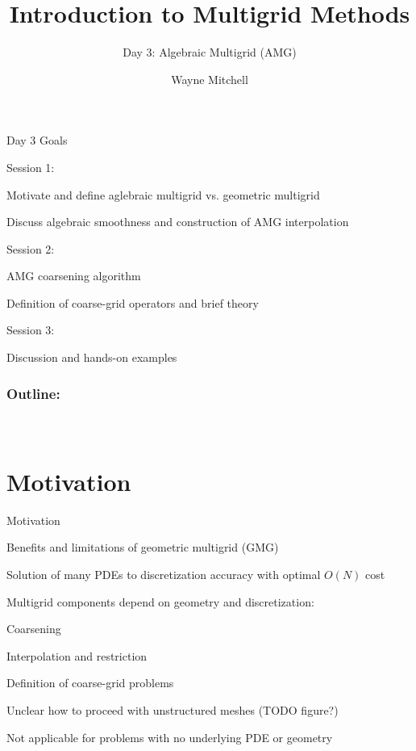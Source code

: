 \documentclass[18pt,xcolor=table]{beamer}
\title[Multigrid]{Introduction to Multigrid Methods}
\subtitle{Day 3: Algebraic Multigrid (AMG)}
\author[Mitchell]{Wayne Mitchell}
\institute{\pgfuseimage{logo}\\Universit\"at Heidelberg\\Institut f\"ur Technische Informatik}
\date[]{\alert{}}
\begin{document}


\DeclareRobustCommand{\Chi}{\raisebox{2pt}{$\chi$}}

\begin{frame}{}
\begin{block}{Day 3 Goals}
\bit
\item Session 1:
\bit
\item Motivate and define aglebraic multigrid vs. geometric multigrid
\item Discuss algebraic smoothness and construction of AMG interpolation
\eit
\item Session 2:
\bit
\item AMG coarsening algorithm
\item Definition of coarse-grid operators and brief theory
\eit
\item Session 3:
\bit
\item Discussion and hands-on examples
\eit
\eit
\end{block}
\end{frame}

\begin{frame}
\frametitle{\bf Outline:}
\framesubtitle{~~}
\tableofcontents
\end{frame}


\section{Motivation}

\begin{frame}{Motivation}
\begin{block}{Benefits and limitations of geometric multigrid (GMG)}
\bit
\item Solution of many PDEs to discretization accuracy with optimal $O(N)$ cost
\item Multigrid components depend on geometry and discretization:
\bit
\item Coarsening
\item Interpolation and restriction
\item Definition of coarse-grid problems
\eit
\item Unclear how to proceed with unstructured meshes (TODO figure?)
\item Not applicable for problems with no underlying PDE or geometry
\eit
\end{block}
\end{frame}
\end{document}
